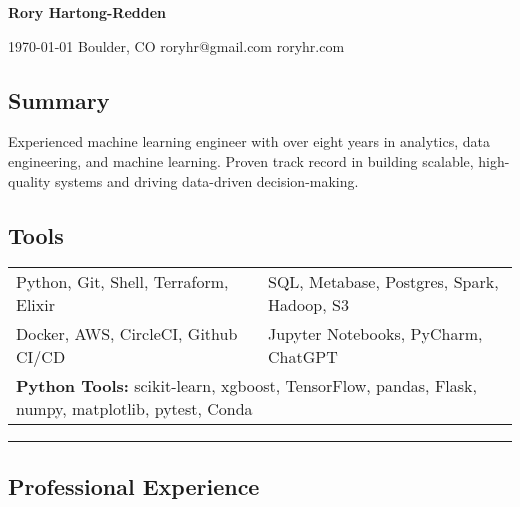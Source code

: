 \documentclass[10pt,letterpaper]{article}
\newenvironment{indentsection}[1]
{\begin{list}{}%
	{\setlength{\leftmargin}{#1}}
	\item[]%
}
{\end{list}}
\begin{document}
{\raggedright \LARGE \bf Rory Hartong-Redden}

{\raggedleft 
\today \/ \textbar
\/ Boulder, CO \textbar
\/ roryhr@gmail.com \textbar
\/ roryhr.com
\\
}

\subsection*{Summary}
\begin{centering}  
Experienced machine learning engineer with over eight years in analytics, data engineering, and machine learning. Proven track record in building scalable, high-quality systems and driving data-driven decision-making. 
\end{centering}

\subsection*{Tools}
\begin{indentsection}{\parindent}
\begin{tabular}{p{0.5\linewidth}   p{0.5\linewidth}} 
	Python, Git, Shell, Terraform, Elixir
	& SQL, Metabase, Postgres, Spark, Hadoop, S3 \\

	Docker, AWS, CircleCI, Github CI/CD
	& Jupyter Notebooks, PyCharm, ChatGPT\\ 
	
	\multicolumn{2}{l}{
		\textbf{Python Tools:} scikit-learn, xgboost, TensorFlow, pandas, Flask, numpy, matplotlib, pytest, Conda
		}
\end{tabular}
\end{indentsection}

\hrule
\subsection*{Professional Experience}
\end{document}
